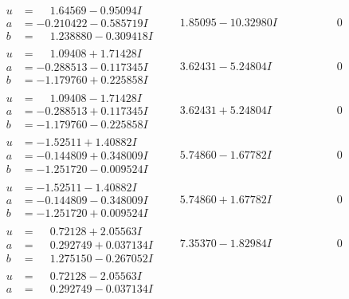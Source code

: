 \documentclass[1p]{elsarticle_modified}
\theoremstyle{definition}
\begin{document}
$$\begin{array}{c|c|c}
 \hline 
\begin{aligned}
u &= \phantom{-}1.64569 - 0.95094 I \\
a &= -0.210422 - 0.585719 I \\
b &= \phantom{-}1.238880 - 0.309418 I\end{aligned}
 & \phantom{-}1.85095 - 10.32980 I & \phantom{-0.000000 } 0 \\ \hline\begin{aligned}
u &= \phantom{-}1.09408 + 1.71428 I \\
a &= -0.288513 - 0.117345 I \\
b &= -1.179760 + 0.225858 I\end{aligned}
 & \phantom{-}3.62431 - 5.24804 I & \phantom{-0.000000 } 0 \\ \hline\begin{aligned}
u &= \phantom{-}1.09408 - 1.71428 I \\
a &= -0.288513 + 0.117345 I \\
b &= -1.179760 - 0.225858 I\end{aligned}
 & \phantom{-}3.62431 + 5.24804 I & \phantom{-0.000000 } 0 \\ \hline\begin{aligned}
u &= -1.52511 + 1.40882 I \\
a &= -0.144809 + 0.348009 I \\
b &= -1.251720 - 0.009524 I\end{aligned}
 & \phantom{-}5.74860 - 1.67782 I & \phantom{-0.000000 } 0 \\ \hline\begin{aligned}
u &= -1.52511 - 1.40882 I \\
a &= -0.144809 - 0.348009 I \\
b &= -1.251720 + 0.009524 I\end{aligned}
 & \phantom{-}5.74860 + 1.67782 I & \phantom{-0.000000 } 0 \\ \hline\begin{aligned}
u &= \phantom{-}0.72128 + 2.05563 I \\
a &= \phantom{-}0.292749 + 0.037134 I \\
b &= \phantom{-}1.275150 - 0.267052 I\end{aligned}
 & \phantom{-}7.35370 - 1.82984 I & \phantom{-0.000000 } 0 \\ \hline\begin{aligned}
u &= \phantom{-}0.72128 - 2.05563 I \\
a &= \phantom{-}0.292749 - 0.037134 I \\

\end{aligned}
\end{array}$$
\end{document}
